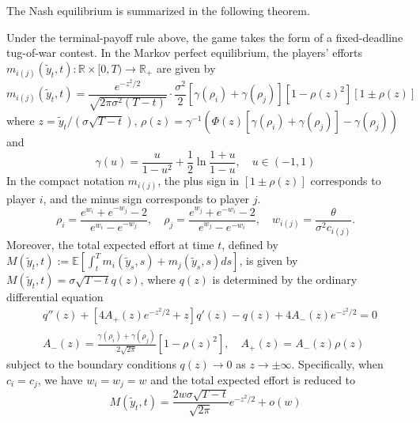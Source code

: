 \documentclass[mnsc]{informs3}
\begin{document}
The Nash equilibrium is summarized in the following theorem.

\begin{theorem}
Under the terminal-payoff rule above, the game takes the form of a fixed-deadline tug-of-war contest.
In the Markov perfect equilibrium, the players’ efforts $m_{i(j)}(\tilde{y}_t, t) :\mathbb{R}\times[0, T)\to\mathbb{R}_+$ are given by
\begin{equation}\label{eq-equilibrium-effort}
m_{i(j)}(\tilde{y}_t, t) = \frac{e^{-z^2/2}}{\sqrt{2\pi\sigma^2(T-t)}}\cdot \frac{\sigma^2}{2}\left[\gamma(\rho_{i}) + \gamma(\rho_{j})\right]\left[1-\rho(z)^2\right]\left[1 \pm \rho(z)\right]
\end{equation}
where $z = \tilde{y}_t / (\sigma\sqrt{T-t})$, $\rho(z) = \gamma^{-1}\left(\Phi(z)\left[\gamma(\rho_{i})+\gamma(\rho_{j})\right]-\gamma(\rho_{j})\right)$ and
\begin{equation}\label{eq-gamma}
\gamma(u) = \frac{u}{1-u^2} + \frac{1}{2}\ln\frac{1+u}{1-u},\quad u\in(-1,1)
\end{equation}
In the compact notation $m_{i(j)}$, the plus sign in $[1\pm\rho(z)]$ corresponds to player $i$, and the minus sign corresponds to player $j$.
\begin{equation*}
\rho_{i} = \frac{e^{w_{i}}+e^{-w_{j}}-2}{e^{w_{i}}-e^{-w_{j}}},
\quad
\rho_{j} = \frac{e^{w_{j}}+e^{-w_{i}}-2}{e^{w_{j}}-e^{-w_{i}}},
\quad
w_{i(j)} = \frac{\theta}{\sigma^2 c_{i(j)}}.
\end{equation*}
Moreover, the total expected effort at time $t$, defined by $M(\tilde{y}_t, t) := \mathbb{E}\left[\int^T_t m_i(\tilde{y}_s, s) + m_j(\tilde{y}_s, s)ds\right]$, is given by $M(\tilde{y}_t, t) = \sigma \sqrt{T-t} q(z)$, where $q(z)$ is determined by the ordinary differential equation
\begin{equation}
\begin{aligned}
&q''(z) + \left[4A_+(z)e^{-z^2/2}+z\right]q'(z) - q(z) + 4A_-(z)e^{-z^2/2} = 0\\
&A_-(z) = \frac{\gamma(\rho_i) + \gamma(\rho_j)}{2\sqrt{2\pi}}[1 - \rho(z)^2],
\quad A_+(z) = A_-(z)\rho(z)
\end{aligned}
\end{equation}
subject to the boundary conditions $q(z)\to0$ as $z\to\pm\infty$.
Specifically, when $c_i = c_j$, we have $w_i = w_j = w$ and the total expected effort is reduced to
\begin{equation}\label{eq-totaleffort-reduced}
M(\tilde{y}_t, t) = \frac{2w\sigma\sqrt{T-t}}{\sqrt{2\pi}}e^{-z^2/2} + o(w)
\end{equation}
\end{theorem}
\end{document}
